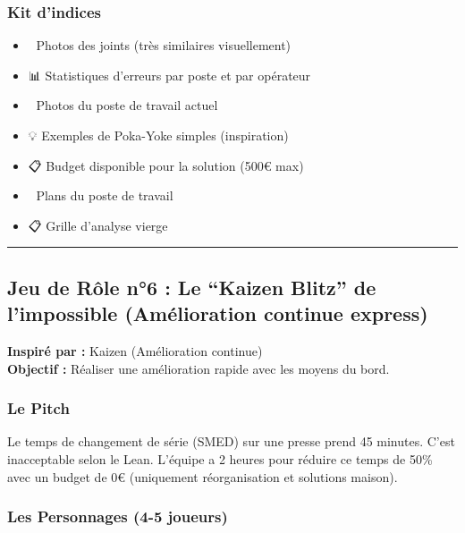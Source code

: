 \documentclass[
]{article}
\providecommand{\tightlist}{%
  \setlength{\itemsep}{0pt}\setlength{\parskip}{0pt}}
\begin{document}
\subsubsection{Kit d'indices}\label{kit-dindices-4}

\begin{itemize}
\tightlist
\item
  📸 Photos des joints (très similaires visuellement)
\item
  📊 Statistiques d'erreurs par poste et par opérateur
\item
  🔧 Photos du poste de travail actuel
\item
  💡 Exemples de Poka-Yoke simples (inspiration)
\item
  📋 Budget disponible pour la solution (500€ max)
\item
  📐 Plans du poste de travail
\item
  📋 Grille d'analyse vierge
\end{itemize}

\begin{center}\rule{0.5\linewidth}{0.5pt}\end{center}

\subsection{Jeu de Rôle n°6 : Le ``Kaizen Blitz'' de l'impossible
(Amélioration continue
express)}\label{jeu-de-ruxf4le-n6-le-kaizen-blitz-de-limpossible-amuxe9lioration-continue-express}

\textbf{Inspiré par :} Kaizen (Amélioration continue)\\
\textbf{Objectif :} Réaliser une amélioration rapide avec les moyens du
bord.

\subsubsection{Le Pitch}\label{le-pitch-5}

Le temps de changement de série (SMED) sur une presse prend 45 minutes.
C'est inacceptable selon le Lean. L'équipe a 2 heures pour réduire ce
temps de 50\% avec un budget de 0€ (uniquement réorganisation et
solutions maison).

\subsubsection{Les Personnages (4-5
joueurs)}\label{les-personnages-4-5-joueurs}
\end{document}
